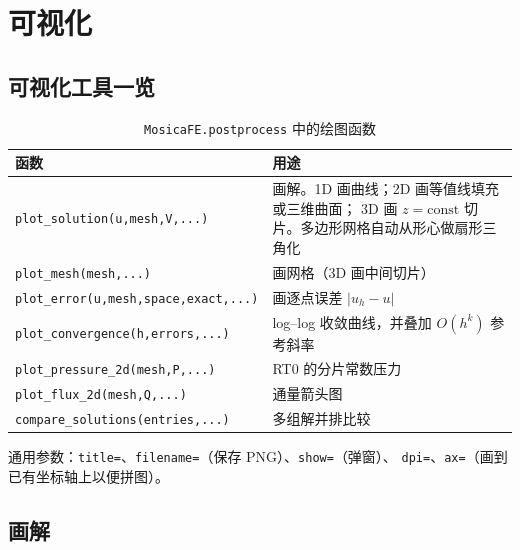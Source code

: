 \documentclass[UTF8,11pt,oneside]{ctexbook}
\theoremstyle{definition}
\theoremstyle{plain}
\newcommand{\code}[1]{\texttt{#1}}
\newcommand{\module}[1]{\texttt{MosicaFE.#1}}
\begin{document}
\chapter{可视化}
\label{chap:visual}

\section{可视化工具一览}

\begin{table}[htbp]
\centering
\caption{\module{postprocess} 中的绘图函数}
\label{tab:plots}
\begin{lrbox}{\guideTableBox}
\begin{tabular}{@{}L{5.6cm}L{9.8cm}@{}}
\toprule
函数 & 用途 \\
\midrule
\code{plot\_\allowbreak solution(u,\allowbreak  mesh,\allowbreak  V,\allowbreak  ...)} & 画解。1D 画曲线；2D 画等值线填充或三维曲面；
3D 画 $z=\text{const}$ 切片。多边形网格自动从形心做扇形三角化 \\
\code{plot\_\allowbreak mesh(mesh,\allowbreak  ...)} & 画网格（3D 画中间切片） \\
\code{plot\_\allowbreak error(u,\allowbreak  mesh,\allowbreak  space,\allowbreak  exact,\allowbreak  ...)} & 画逐点误差 $|u_h-u|$ \\
\code{plot\_\allowbreak convergence(h,\allowbreak  errors,\allowbreak  ...)} & log--log 收敛曲线，并叠加 $O(h^k)$ 参考斜率 \\
\code{plot\_\allowbreak pressure\_\allowbreak 2d(mesh,\allowbreak  P,\allowbreak  ...)} & RT0 的分片常数压力 \\
\code{plot\_\allowbreak flux\_\allowbreak 2d(mesh,\allowbreak  Q,\allowbreak  ...)} & 通量箭头图 \\
\code{compare\_\allowbreak solutions(entries,\allowbreak  ...)} & 多组解并排比较 \\
\bottomrule
\end{tabular}
\end{lrbox}%
\ifdim\wd\guideTableBox>\linewidth
  \resizebox{\linewidth}{!}{\usebox{\guideTableBox}}%
\else\usebox{\guideTableBox}\fi
\end{table}

通用参数：\code{title=}、\code{filename=}（保存 PNG）、\code{show=}（弹窗）、
\code{dpi=}、\code{ax=}（画到已有坐标轴上以便拼图）。

\section{画解}
\end{document}
